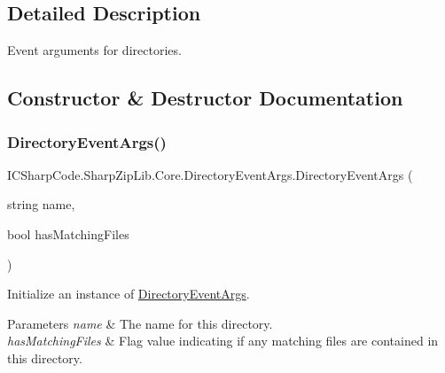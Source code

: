 \subsection{Detailed Description}
Event arguments for directories. 



\subsection{Constructor \& Destructor Documentation}
\mbox{\label{class_i_c_sharp_code_1_1_sharp_zip_lib_1_1_core_1_1_directory_event_args_a2b53943e8cfd1d189f8e4c8d171d8f8d}} 
\subsubsection{\texorpdfstring{Directory\+Event\+Args()}{DirectoryEventArgs()}}
{\footnotesize\ttfamily I\+C\+Sharp\+Code.\+Sharp\+Zip\+Lib.\+Core.\+Directory\+Event\+Args.\+Directory\+Event\+Args (\begin{DoxyParamCaption}\item[{string}]{name,  }\item[{bool}]{has\+Matching\+Files }\end{DoxyParamCaption})\hspace{0.3cm}{\ttfamily [inline]}}



Initialize an instance of \hyperlink{class_i_c_sharp_code_1_1_sharp_zip_lib_1_1_core_1_1_directory_event_args}{Directory\+Event\+Args}. 


\begin{DoxyParams}{Parameters}
{\em name} & The name for this directory.\\
\hline
{\em has\+Matching\+Files} & Flag value indicating if any matching files are contained in this directory.\\
\hline
\end{DoxyParams}


